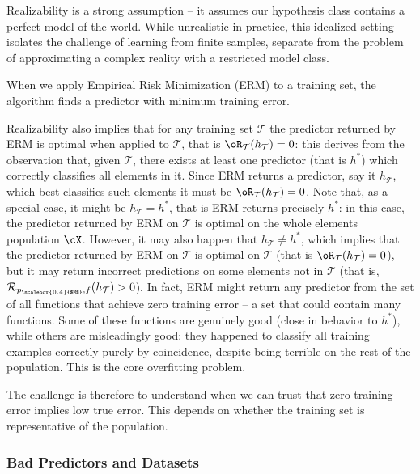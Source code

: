 Realizability is a strong assumption -- it assumes our hypothesis class contains a perfect model of the world. While unrealistic in practice, this idealized setting isolates the challenge of learning from finite samples, separate from the problem of approximating a complex reality with a restricted model class. %

When we apply Empirical Risk Minimization (ERM) to a training set, the algorithm finds a predictor with minimum training error. 

Realizability also implies that for any training set $\mathcal{T}$ the predictor returned by ERM is optimal when applied to $\mathcal{T}$, that is $\oR_{\mathcal{T}}(h_{\mathcal{T}})=0$: this derives from the observation that, given $\mathcal{T}$, there exists at least one predictor (that is $h^*$) which correctly classifies all elements in it. Since ERM returns a predictor, say it $h_{\mathcal{T}}$, which best classifies such elements it must be $\oR_{\mathcal{T}}(h_{\mathcal{T}})=0$. Note that, as a special case, it might be $h_{\mathcal{T}}=h^*$, that is ERM returns precisely $h^*$: in this case, the predictor returned by ERM on $\mathcal{T}$ is optimal on the whole elements population $\cX$. However, it may also happen that $h_{\mathcal{T}}\neq h^*$, which implies that the predictor returned by ERM on $\mathcal{T}$ is optimal on $\mathcal{T}$ (that is $\oR_{\mathcal{T}}(h_{\mathcal{T}})=0$), but it may return incorrect predictions on some elements not in $\mathcal{T}$ (that is, $\mathcal{R}_{p_{\scalebox{0.4}{$M$}},f}(h_{\mathcal{T}})>0$).
In fact, ERM might return any predictor from the set of all functions that achieve zero training error -- a set that could contain many functions. Some of these functions are genuinely good (close in behavior to $h^*$), while others are misleadingly good: they happened to classify all training examples correctly purely by coincidence, despite being terrible on the rest of the population. This is the core overfitting problem.

The challenge is therefore to understand when we can trust that zero training error implies low true error. This depends on whether the training set is \alert{representative} of the population.

\subsubsection*{Bad Predictors and Datasets}

